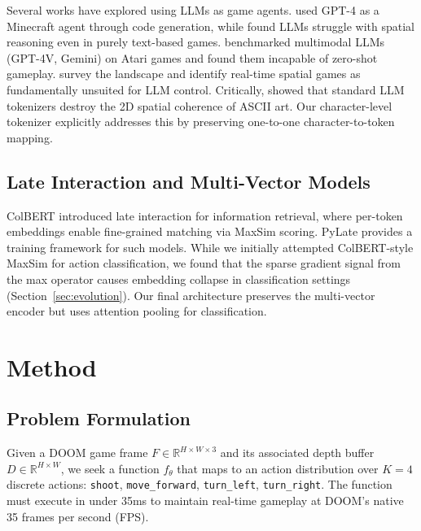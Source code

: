 \documentclass[11pt,a4paper]{article}
\begin{document}
Several works have explored using LLMs as game agents. \citet{wang2023voyager} used GPT-4 as a Minecraft agent through code generation, while \citet{tsai2023textgames} found LLMs struggle with spatial reasoning even in purely text-based games. \citet{waytowich2024atarigpt} benchmarked multimodal LLMs (GPT-4V, Gemini) on Atari games and found them incapable of zero-shot gameplay. \citet{gallotta2024llmgames} survey the landscape and identify real-time spatial games as fundamentally unsuited for LLM control. Critically, \citet{asciibench2024} showed that standard LLM tokenizers destroy the 2D spatial coherence of ASCII art. Our character-level tokenizer explicitly addresses this by preserving one-to-one character-to-token mapping.

\subsection{Late Interaction and Multi-Vector Models}

ColBERT \citep{khattab2020colbert} introduced late interaction for information retrieval, where per-token embeddings enable fine-grained matching via MaxSim scoring. PyLate \citep{pylate2025} provides a training framework for such models. While we initially attempted ColBERT-style MaxSim for action classification, we found that the sparse gradient signal from the max operator causes embedding collapse in classification settings (Section~\ref{sec:evolution}). Our final architecture preserves the multi-vector encoder but uses attention pooling for classification.

\section{Method}
\label{sec:method}

\subsection{Problem Formulation}

Given a DOOM game frame $F \in \mathbb{R}^{H \times W \times 3}$ and its associated depth buffer $D \in \mathbb{R}^{H \times W}$, we seek a function $f_\theta$ that maps to an action distribution over $K=4$ discrete actions: \texttt{shoot}, \texttt{move\_forward}, \texttt{turn\_left}, \texttt{turn\_right}. The function must execute in under 35ms to maintain real-time gameplay at DOOM's native 35 frames per second (FPS).
\end{document}
